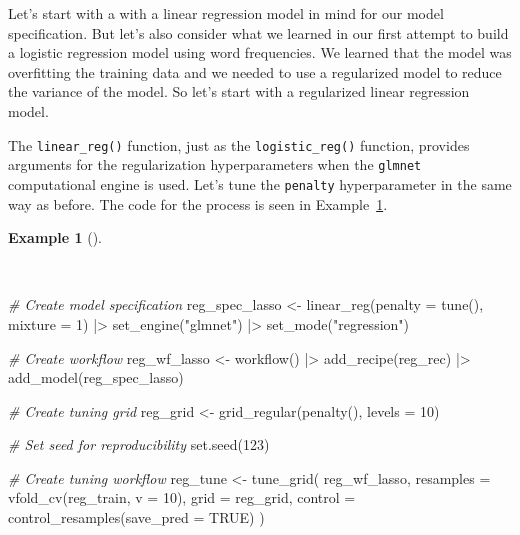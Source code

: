 \documentclass[
  letterpaper,
  DIV=11,
  numbers=noendperiod]{scrreprt}
\newenvironment{Shaded}{\begin{snugshade}}{\end{snugshade}}
\newcommand{\AttributeTok}[1]{\textcolor[rgb]{0.00,0.00,0.00}{#1}}
\newcommand{\CommentTok}[1]{\textcolor[rgb]{0.00,0.00,0.00}{\textit{#1}}}
\newcommand{\ConstantTok}[1]{\textcolor[rgb]{0.00,0.00,0.00}{#1}}
\newcommand{\DecValTok}[1]{\textcolor[rgb]{0.00,0.00,0.00}{#1}}
\newcommand{\FunctionTok}[1]{\textcolor[rgb]{0.00,0.00,0.00}{#1}}
\newcommand{\NormalTok}[1]{\textcolor[rgb]{0.00,0.00,0.00}{#1}}
\newcommand{\OtherTok}[1]{\textcolor[rgb]{0.00,0.00,0.00}{#1}}
\newcommand{\SpecialCharTok}[1]{\textcolor[rgb]{0.00,0.00,0.00}{#1}}
\newcommand{\StringTok}[1]{\textcolor[rgb]{0.00,0.00,0.00}{#1}}
\theoremstyle{definition}
\newtheorem{example}{Example}[chapter]
\theoremstyle{remark}
\begin{document}
Let's start with a with a linear regression model in mind for our model
specification. But let's also consider what we learned in our first
attempt to build a logistic regression model using word frequencies. We
learned that the model was overfitting the training data and we needed
to use a regularized model to reduce the variance of the model. So let's
start with a regularized linear regression model.

The \texttt{linear\_reg()} function, just as the
\texttt{logistic\_reg()} function, provides arguments for the
regularization hyperparameters when the \texttt{glmnet} computational
engine is used. Let's tune the \texttt{penalty} hyperparameter in the
same way as before. The code for the process is seen in
Example~\ref{exm-pda-reg-model-spec-tune}.

\begin{example}[]\protect\hypertarget{exm-pda-reg-model-spec-tune}{}\label{exm-pda-reg-model-spec-tune}

~

\begin{Shaded}
\begin{Highlighting}[]
\CommentTok{\# Create model specification}
\NormalTok{reg\_spec\_lasso }\OtherTok{\textless{}{-}}
  \FunctionTok{linear\_reg}\NormalTok{(}\AttributeTok{penalty =} \FunctionTok{tune}\NormalTok{(), }\AttributeTok{mixture =} \DecValTok{1}\NormalTok{) }\SpecialCharTok{|\textgreater{}}
  \FunctionTok{set\_engine}\NormalTok{(}\StringTok{"glmnet"}\NormalTok{) }\SpecialCharTok{|\textgreater{}}
  \FunctionTok{set\_mode}\NormalTok{(}\StringTok{"regression"}\NormalTok{)}

\CommentTok{\# Create workflow}
\NormalTok{reg\_wf\_lasso }\OtherTok{\textless{}{-}}
  \FunctionTok{workflow}\NormalTok{() }\SpecialCharTok{|\textgreater{}}
  \FunctionTok{add\_recipe}\NormalTok{(reg\_rec) }\SpecialCharTok{|\textgreater{}}
  \FunctionTok{add\_model}\NormalTok{(reg\_spec\_lasso)}

\CommentTok{\# Create tuning grid}
\NormalTok{reg\_grid }\OtherTok{\textless{}{-}}
  \FunctionTok{grid\_regular}\NormalTok{(}\FunctionTok{penalty}\NormalTok{(), }\AttributeTok{levels =} \DecValTok{10}\NormalTok{)}

\CommentTok{\# Set seed for reproducibility}
\FunctionTok{set.seed}\NormalTok{(}\DecValTok{123}\NormalTok{)}

\CommentTok{\# Create tuning workflow}
\NormalTok{reg\_tune }\OtherTok{\textless{}{-}}
  \FunctionTok{tune\_grid}\NormalTok{(}
\NormalTok{    reg\_wf\_lasso,}
    \AttributeTok{resamples =} \FunctionTok{vfold\_cv}\NormalTok{(reg\_train, }\AttributeTok{v =} \DecValTok{10}\NormalTok{),}
    \AttributeTok{grid =}\NormalTok{ reg\_grid,}
    \AttributeTok{control =} \FunctionTok{control\_resamples}\NormalTok{(}\AttributeTok{save\_pred =} \ConstantTok{TRUE}\NormalTok{)}
\NormalTok{  )}


\end{Highlighting}
\end{Shaded}
\end{example}
\end{document}
